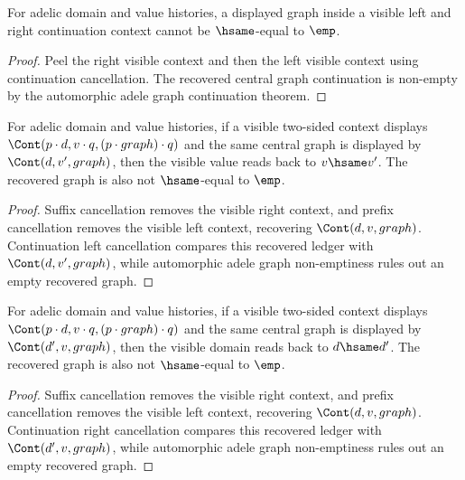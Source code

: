 \begin{theorem}
\label{thm:automorphic-adele-graph-visible-context-nonempty}
For adelic domain and value histories, a displayed graph inside a visible
left and right continuation context cannot be \(\hsame\)-equal to \(\emp\).
\end{theorem}
\begin{proof}
Peel the right visible context and then the left visible context using
continuation cancellation. The recovered central graph continuation is
non-empty by the automorphic adele graph continuation theorem.
\end{proof}

\begin{theorem}
\label{thm:automorphic-adele-graph-visible-context-value-readback}
For adelic domain and value histories, if a visible two-sided context displays
$\Cont(p \cdot d, v \cdot q, (p \cdot graph) \cdot q)$ and the same central
graph is displayed by $\Cont(d,v',graph)$, then the visible value reads back to
$v\hsame v'$. The recovered graph is also not $\hsame$-equal to $\emp$.
\end{theorem}
\begin{proof}
Suffix cancellation removes the visible right context, and prefix cancellation
removes the visible left context, recovering $\Cont(d,v,graph)$. Continuation
left cancellation compares this recovered ledger with $\Cont(d,v',graph)$,
while automorphic adele graph non-emptiness rules out an empty recovered graph.
\end{proof}

\begin{theorem}
\label{thm:automorphic-adele-graph-visible-context-domain-readback}
For adelic domain and value histories, if a visible two-sided context displays
$\Cont(p \cdot d, v \cdot q, (p \cdot graph) \cdot q)$ and the same central
graph is displayed by $\Cont(d',v,graph)$, then the visible domain reads back
to $d\hsame d'$. The recovered graph is also not $\hsame$-equal to $\emp$.
\end{theorem}
\begin{proof}
Suffix cancellation removes the visible right context, and prefix cancellation
removes the visible left context, recovering $\Cont(d,v,graph)$. Continuation
right cancellation compares this recovered ledger with $\Cont(d',v,graph)$,
while automorphic adele graph non-emptiness rules out an empty recovered graph.
\end{proof}

